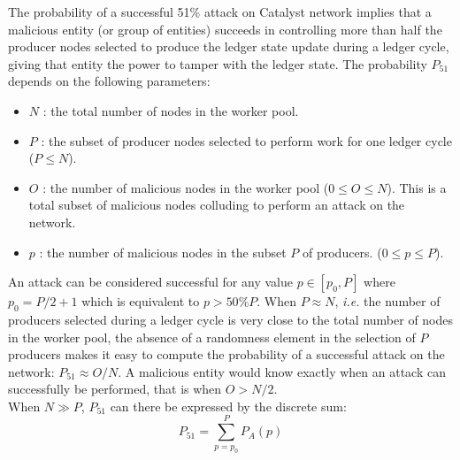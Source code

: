 The probability of a successful 51\% attack on Catalyst network implies that a malicious entity (or group of entities) succeeds in controlling more than half the producer nodes selected to produce the ledger state update during a ledger cycle, giving that entity the power to tamper with the ledger state. The probability $P_{51}$ depends on the following parameters:
\begin{itemize}
\item $N$ : the total number of nodes in the worker pool. 
\item $P$ : the subset of producer nodes selected to perform work for one ledger cycle ($P \leq N$).
\item $O$ : the number of malicious nodes in the worker pool ($0 \leq O \leq N$). This is a total subset of malicious nodes colluding to perform an attack on the network.
\item $p$ : the number of malicious nodes in the subset $P$ of producers. ($0 \leq p \leq P$).
\end{itemize}
An attack can be considered successful for any value $p \in [p_0,P]$ where $p_0 = P/2 + 1$ which is equivalent to $p > 50\%P$. When $P \approx N$, \textit{i.e.} the number of producers selected during a ledger cycle is very close to the total number of nodes in the worker pool, the absence of a randomness element in the selection of $P$ producers makes it easy to compute the probability of a successful attack on the network: $P_{51} \approx O/N$. A malicious entity would know exactly when an attack can successfully be performed, that is when $O > N/2$. \\

When $N \gg P$, $P_{51}$ can there be expressed by the discrete sum:
\begin{equation}
\label{eq:1}
P_{51} = \sum_{p=p_0}^{P} P_{A}(p)
\end{equation}

